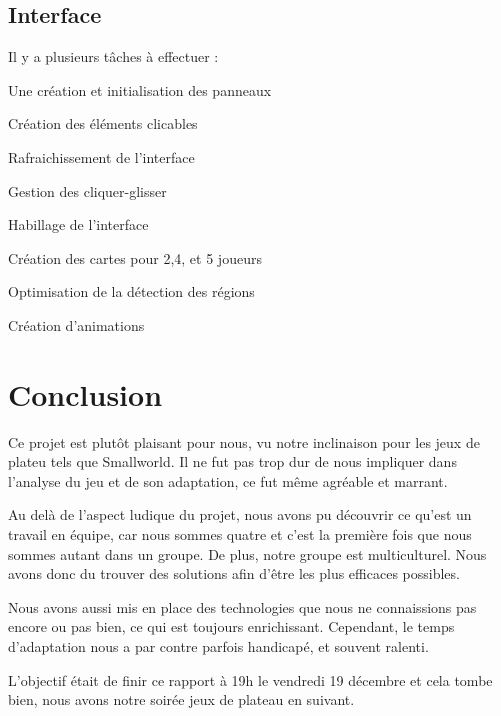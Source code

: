 \documentclass[11pt]{report}
\begin{document}
	\section{Interface}
	
	Il y a plusieurs tâches à effectuer :
	\begin{description}
	\item Une création et initialisation des panneaux
	\item Création des éléments clicables
	\item Rafraichissement de l'interface
	\item Gestion des cliquer-glisser
	\item Habillage de l'interface
	\item Création des cartes pour 2,4, et 5 joueurs
	\item Optimisation de la détection des régions
	\item Création d'animations
	
	\end{description}

\chapter{Conclusion}
	Ce projet est plutôt plaisant pour nous, vu notre inclinaison pour les jeux de plateu tels que Smallworld\up{\copyright}. Il ne fut pas trop dur de nous impliquer dans l'analyse du jeu et de son adaptation, ce fut même agréable et marrant.
	
	Au delà de l'aspect ludique du projet, nous avons pu découvrir ce qu'est un travail en équipe, car nous sommes quatre et c'est la première fois que nous sommes autant dans un groupe. De plus, notre groupe est multiculturel. Nous avons donc du trouver des solutions afin d'être les plus efficaces possibles.
	
	Nous avons aussi mis en place des technologies que nous ne connaissions pas encore ou pas bien, ce qui est toujours enrichissant. Cependant, le temps d'adaptation nous a par contre parfois handicapé, et souvent ralenti.
	
	L'objectif était de finir ce rapport à 19h le vendredi 19 décembre et cela tombe bien, nous avons notre soirée jeux de plateau en suivant. 
\end{document}
